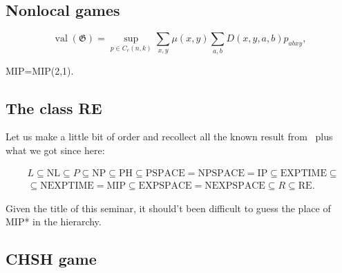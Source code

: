 \subsection{Nonlocal games}
\begin{defn}
    \begin{equation}
    \operatorname{val}(\mathfrak{G})=\sup _{p \in C_{c}(n, k)} \sum_{x, y} \mu(x, y) \sum_{a, b} D(x, y, a, b) p_{a b x y},
    \end{equation}
\end{defn}
\begin{theorem}
MIP=MIP(2,1).
\end{theorem}
\subsection{The class RE}


Let us make a little bit of order and recollect all the known result from~\cite{papadimitriou1994computational} plus what we got since here:

\begin{equation}
\begin{split}
    &L \subseteq \text{NL} \subseteq P \subseteq \text{NP} \subseteq \text{PH} \subseteq \text{PSPACE} = \text{NPSPACE} = \text{IP} \subseteq \text{EXPTIME} \subseteq  \\
    &\subseteq \text{NEXPTIME} = \text{MIP} \subseteq \text{EXPSPACE} = \text{NEXPSPACE} \subseteq R \subseteq \text{RE}.
\end{split}
\end{equation}

Given the title of this seminar, it should't been difficult to guess the place of MIP* in the hierarchy.

\subsection{CHSH game}
